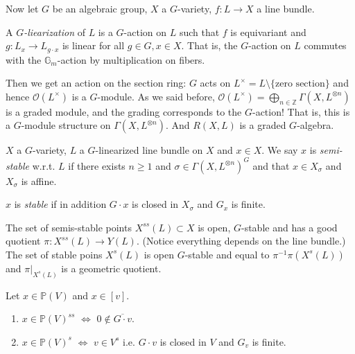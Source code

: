 \medskip\noindent
Now let $G$ be an algebraic group, $X$ a $G$-variety, $f:L \to X$ a line
bundle.

\begin{definition}
\label{definition-G-linearization}
A  {\it $G$-liearization} of $L$ is a $G$-action on $L$ such that $f$ is
equivariant and $g:L_x \to L_{g\cdot x}$ is linear for all $g \in G, x \in X$.
That is, the $G$-action on $L$ commutes with the $\mathbb{G}_m$-action by
multiplication on fibers.
\end{definition}

Then we get an action on the section ring: $G$ acts on 
$L^{\times}=L\setminus \{\text{zero section}\}$ and hence
$\mathcal{O}(L^{\times})$ is a $G$-module. As we said before,
 $\mathcal{O}(L^{\times})=\bigoplus_{n \in \mathbb{Z}}\Gamma(X,L^{\otimes n})$
is a graded module, and the grading corresponds to the $G$-action! That is, 
this is a $G$-module structure on $\Gamma(X,L^{\otimes n})$. And $R(X,L)$ is a
graded $G$-algebra.

\begin{definition}
\label{definition-semi-stable-line-bundle}
$X$ a $G$-variety, $L$ a $G$-linearized line bundle on $X$ and $x \in X$. We say
$x$ is {\it semi-stable} w.r.t. $L$ if there exists $n \geq 1$ and 
$\sigma \in \Gamma(X,L^{\otimes n})^G$ and that $x \in X_\sigma$ and 
$X_\sigma$ is affine.

$x$ is  {\it stable} if in addition $G\cdot x$ is closed in $X_\sigma$ 
and $G_x$ is finite.
\end{definition}

\begin{theorem}[Mumford]
\label{theorem-Mumford}
The set of semis-stable points $X^{ss}(L)\subset X$ is open, $G$-stable and has 
a good quotient $\pi:X^{ss}(L) \to Y(L)$. (Notice everything depends on the 
line bundle.) The set of stable poins $X^s(L)$ is open $G$-stable and equal to 
$\pi^{-1}\pi(X^s(L))$ and $\pi|_{X^s(L)}$ is a geometric quotient.
\end{theorem}

\begin{proposition}
\label{proposition-on-projectivization-of-V}
Let $x \in \mathbb{P}(V)$ and $x \in [v]$.
\begin{enumerate}
\item $x \in \mathbb{P}(V)^{ss}$ $\iff$ $0 \not \in \overline{G\cdot v}$.
\item $x\in \mathbb{P}(V)^s$ $\iff$ $v \in V^s$ i.e. $G\cdot v$ is closed in $V$
and $G_v$ is finite.
\end{enumerate}
\end{proposition}

